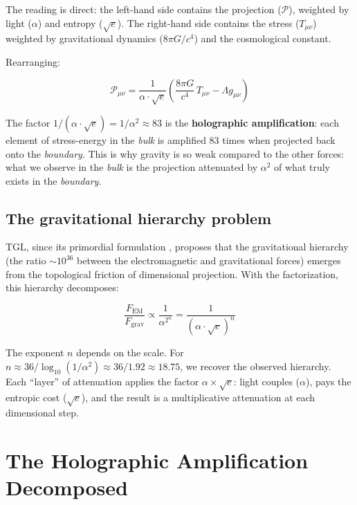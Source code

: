 \documentclass[12pt,a4paper,twoside]{article}
\newcommand{\alphaii}{\alpha^{2}}
\newcommand{\boundary}{\textit{boundary}}
\newcommand{\bulk}{\textit{bulk}}
\begin{document}
The reading is direct: the left-hand side contains the projection ($\mathcal{P}$), weighted by light ($\alpha$) and entropy ($\sqrt{e}$). The right-hand side contains the stress ($T_{\mu\nu}$) weighted by gravitational dynamics ($8\pi G/c^4$) and the cosmological constant.

Rearranging:

\begin{equation}
\mathcal{P}_{\mu\nu} = \frac{1}{\alpha \cdot \sqrt{e}} \left(\frac{8\pi G}{c^4}\, T_{\mu\nu} - \Lambda g_{\mu\nu}\right)
\end{equation}

The factor $1/(\alpha \cdot \sqrt{e}) = 1/\alphaii \approx 83$ is the \textbf{holographic amplification}: each element of stress-energy in the \bulk{} is amplified 83 times when projected back onto the \boundary. This is why gravity is so weak compared to the other forces: what we observe in the \bulk{} is the projection attenuated by $\alphaii$ of what truly exists in the \boundary.

\subsection{The gravitational hierarchy problem}

TGL, since its primordial formulation \cite{Miguel2026Fronteira}, proposes that the gravitational hierarchy (the ratio $\sim 10^{36}$ between the electromagnetic and gravitational forces) emerges from the topological friction of dimensional projection. With the factorization, this hierarchy decomposes:

\begin{equation}
\frac{F_{\text{EM}}}{F_{\text{grav}}} \propto \frac{1}{\alphaii^n} = \frac{1}{(\alpha \cdot \sqrt{e})^n}
\end{equation}

The exponent $n$ depends on the scale. For $n \approx 36/\log_{10}(1/\alphaii) \approx 36/1.92 \approx 18.75$, we recover the observed hierarchy. Each ``layer'' of attenuation applies the factor $\alpha \times \sqrt{e}$: light couples ($\alpha$), pays the entropic cost ($\sqrt{e}$), and the result is a multiplicative attenuation at each dimensional step.



\section{The Holographic Amplification Decomposed}
\label{sec:amplificacao}
\end{document}
